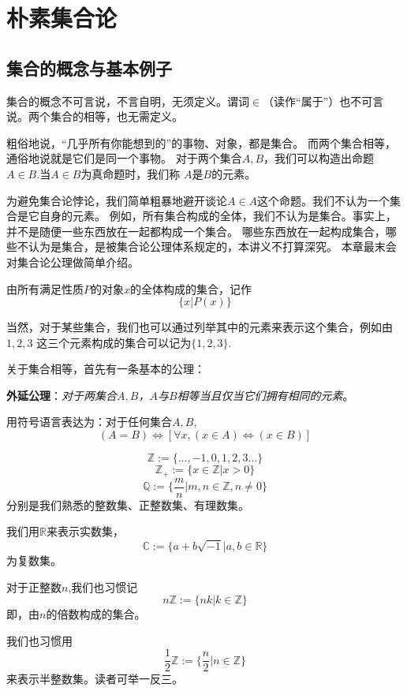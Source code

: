 \section{朴素集合论}
\subsection{集合的概念与基本例子}
\begin{definition}
集合的概念不可言说，不言自明，无须定义。谓词$\in$（读作“属于”）也不可言说。两个集合的相等，也无需定义。
\end{definition}
粗俗地说，“几乎所有你能想到的”的事物、对象，都是集合。
而两个集合相等，通俗地说就是它们是同一个事物。
对于两个集合$A,B$，我们可以构造出命题$A\in B$.当$A\in B$为真命题时，我们称
$A$是$B$的元素。

为避免集合论悖论，我们简单粗暴地避开谈论$A\in A$这个命题。我们不认为一个集合是它自身的元素。
例如，所有集合构成的全体，我们不认为是集合。事实上，并不是随便一些东西放在一起都构成一个集合。
哪些东西放在一起构成集合，哪些不认为是集合，是被集合论公理体系规定的，本讲义不打算深究。
本章最末会对集合论公理做简单介绍。\vs

由所有满足性质$P$的对象$x$的全体构成的集合，记作
$$\{x|P(x)\}$$

当然，对于某些集合，我们也可以通过列举其中的元素来表示这个集合，例如由$1,2,3$
这三个元素构成的集合可以记为$\{1,2,3\}$.

关于集合相等，首先有一条基本的公理：\vs

\textbf{外延公理}：\emph{对于两集合$A,B$，$A$与$B$相等当且仅当它们拥有相同的元素}。

用符号语言表达为：对于任何集合$A,B$,
$$(A=B)\Leftrightarrow[\forall x,(x\in A)\Leftrightarrow(x\in B)]$$

\begin{example}[常见的集合及其记号]
$$\mathbb{Z}:=\{...,-1,0,1,2,3...\}$$
$$\mathbb{Z_+}:=\{x\in\mathbb{Z}|x>0\}$$
$$\mathbb{Q}:=\{\frac{m}{n}|m,n\in\mathbb{Z},n\neq0\}$$
分别是我们熟悉的整数集、正整数集、有理数集。
\end{example}
我们用$\mathbb{R}$来表示实数集，
$$\mathbb{C}:=\{a+b\sqrt{-1}|a,b\in\mathbb{R}\}$$
为复数集。

\begin{example}对于正整数$n$,我们也习惯记
$$n\mathbb{Z}:=\{nk|k\in\mathbb{Z}\}$$
即，由$n$的倍数构成的集合。
\end{example}

我们也习惯用
$$\frac{1}{2}\mathbb{Z}:=\{\frac{n}{2}|n\in\mathbb{Z}\}$$
来表示半整数集。读者可举一反三。

